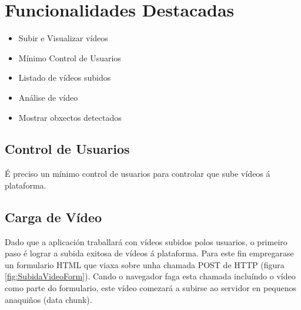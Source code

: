 \chapter{Funcionalidades Destacadas}


\begin{itemize}
 \item Subir e Visualizar vídeos
 \item Mínimo Control de Usuarios
 \item Listado de vídeos subidos
 \item Análise de vídeo
 \item Mostrar obxectos detectados
\end{itemize}



\section{Control de Usuarios}
	É preciso un mínimo control de usuarios para controlar que sube vídeos á plataforma.

\section{Carga de Vídeo}
	Dado que a aplicación traballará con vídeos subidos polos usuarios, o primeiro paso é lograr
	a subida exitosa de vídeos á plataforma. Para este fin empregarase un formulario HTML que 
	viaxa sobre unha chamada POST de HTTP (figura \ref{fig:SubidaVideoForm}). 
	Cando o navegador faga esta chamada incluíndo o vídeo como parte do formulario, este vídeo
	comezará a subirse ao servidor en pequenos anaquiños (data chunk).
	
